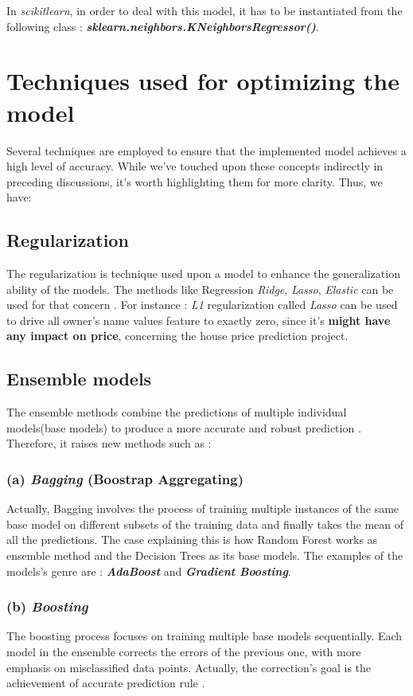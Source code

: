 \documentclass[12pt,a4paper, oneside]{book}
\begin{document}
 In \textit{scikitlearn}, in order to deal with this model, it has to be instantiated from the following class : \newline \textit{\textbf{sklearn.neighbors.KNeighborsRegressor()}}. 
 
\section{Techniques used for optimizing the model} 
Several techniques are employed to ensure that the implemented model achieves a high level of accuracy. While we've touched upon these concepts indirectly in preceding discussions, it's worth highlighting them for more clarity. Thus, we have:
\subsection*{Regularization} 
The regularization is technique used upon a model to enhance the generalization ability of the models. The methods like Regression \textit{Ridge}, \textit{Lasso},  \textit{Elastic} can be used for that concern \cite{mlwithpython}.  For instance : \textit{L1} regularization called \textit{Lasso} can be used to drive all  owner's name values feature to exactly zero, since it's \textbf{might have any impact on price}, concerning the house price prediction project.
\subsection*{Ensemble models}
The ensemble methods combine the predictions of multiple individual models(base models) to produce a more accurate and robust prediction \cite{kabari2019comparison}. Therefore, it raises new methods such as :
\subsubsection{(a) \textit{Bagging} (Boostrap Aggregating)} 
Actually, Bagging involves the process of training multiple instances of the same base model on different subsets of the training data and finally takes the mean of all the predictions. The case explaining this is how Random Forest works as ensemble method and the Decision Trees as its base models. The examples of the models's genre are : \textbf{\textit{AdaBoost}} and \textbf{\textit{Gradient Boosting}}.
\subsubsection{(b) \textit{Boosting}} 
The boosting process focuses on training multiple base models sequentially. Each model in the ensemble corrects the errors of the previous one, with more emphasis on misclassified data points. Actually, the correction's goal is the achievement of accurate prediction rule \cite{praveena2017literature}.
\end{document}
